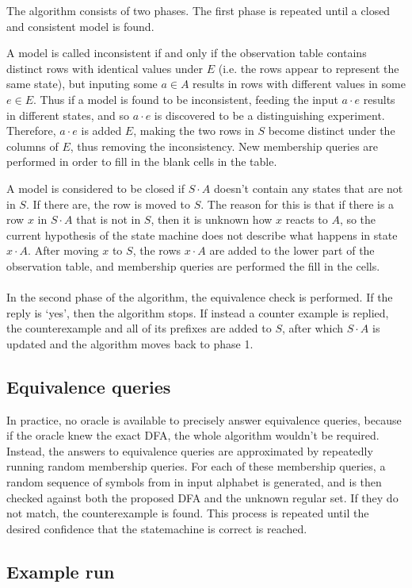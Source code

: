\documentclass[multi,crop=false,class=article]{standalone}
\newcommand{\concat}{\cdot}
\begin{document}
The algorithm consists of two phases. The first phase is repeated until a closed
and consistent model is found.

A model is called inconsistent if and only if the observation table contains
distinct rows with identical values under $E$ (i.e. the rows appear to represent
the same state), but inputing some $a \in A$ results in rows with different
values in some $e \in E$. Thus if a model is found to be inconsistent, feeding
the input $a \concat e$ results in different states, and so $a \concat e$ is
discovered to be a distinguishing experiment. Therefore, $a \concat e$ is added
$E$, making the two rows in $S$ become distinct under the columns of $E$, thus
removing the inconsistency. New membership queries are performed in order to
fill in the blank cells in the table.

A model is considered to be closed if $S \concat A$ doesn't contain any states
that are not in $S$. If there are, the row is moved to $S$. The reason for this
is that if there is a row $x$ in $S \concat A$ that is not in $S$, then it is
unknown how $x$ reacts to $A$, so the current hypothesis of the state machine
does not describe what happens in state $x \concat A$. After moving $x$ to $S$,
the rows $x \concat A$ are added to the lower part of the observation table, and
membership queries are performed the fill in the cells. 
\\\\
In the second phase of the algorithm, the equivalence check is
performed. If the reply is `yes', then the algorithm stops. If instead a counter
example is replied, the counterexample and all of its prefixes are added to $S$,
after which $S \concat A$ is updated and the algorithm moves back to phase 1.

\subsection {Equivalence queries}

In practice, no oracle is available to precisely answer equivalence queries,
because if the oracle knew the exact DFA, the whole algorithm wouldn't be
required. Instead, the answers to equivalence queries are approximated by
repeatedly running random membership queries. For each of these membership
queries, a random sequence of symbols from in input alphabet is generated, and
is then checked against both the proposed DFA and the unknown regular set. If
they do not match, the counterexample is found. This process is repeated until
the desired confidence that the statemachine is correct is reached.

\subsection {Example run}
\end{document}
